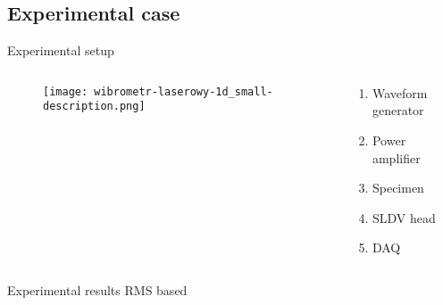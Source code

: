 \documentclass[10pt,aspectratio=169,dvipsnames]{beamer} %
\begin{document}
		\subsection{Experimental case}
		\begin{frame}{Experimental setup}
			\begin{columns}[T]
				\begin{column}[t]{0.55\textwidth}
					\begin{figure}
						\centering
						\texttt{[image: wibrometr-laserowy-1d\_small-description.png]}
					\end{figure}
				\end{column}
				\begin{column}[t]{0.4\textwidth}
					\begin{enumerate}
						\item Waveform generator
						\item Power amplifier	
						\item Specimen
						\item SLDV head
						\item DAQ
					\end{enumerate}
				\end{column}
			\end{columns}
		\end{frame}
		
		\setcounter{subfigure}{0}
		\begin{frame}{Experimental results RMS based}
			\centering
			\begin{figure}
				\qquad
				\qquad
				\qquad
				\\
				\qquad
				\qquad
			\end{figure}
		\end{frame}
		
\end{document}
